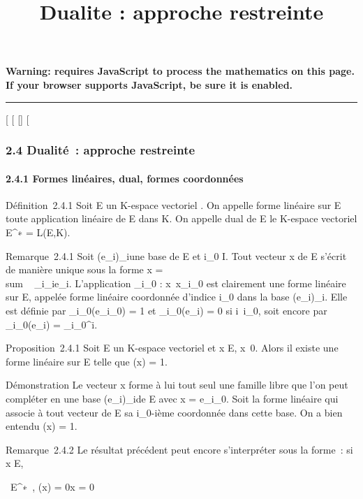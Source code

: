 \documentclass[]{article}
\title{Dualite : approche restreinte}
\author{}
\date{}
\begin{document}
\maketitle

\textbf{Warning: 
requires JavaScript to process the mathematics on this page.\\ If your
browser supports JavaScript, be sure it is enabled.}

\begin{center}\rule{3in}{0.4pt}\end{center}

{[}
{[}
{[}{]}
{[}

\subsubsection{2.4 Dualité~: approche restreinte}

\paragraph{2.4.1 Formes linéaires, dual, formes coordonnées}

Définition~2.4.1 Soit E un K-espace vectoriel . On appelle forme
linéaire sur E toute application linéaire de E dans K. On appelle dual
de E le K-espace vectoriel E^∗ = L(E,K).

Remarque~2.4.1 Soit (e\_i)\_i\inI une base de E et
i\_0 \in I. Tout vecteur x de E s'écrit de manière unique sous la
forme x = \\sum ~
\_i\inIx\_ie\_i. L'application
\phi\_i\_0 :
x\mapsto~x\_i\_0 est clairement une
forme linéaire sur E, appelée forme linéaire coordonnée d'indice
i\_0 dans la base (e\_i)\_i\inI. Elle est définie
par \phi\_i\_0(e\_i\_0) = 1 et
\phi\_i\_0(e\_i) = 0 si
i\neq~i\_0, soit encore par
\phi\_i\_0(e\_i) =
\delta\_i\_0^i.

Proposition~2.4.1 Soit E un K-espace vectoriel et x \in E,
x\neq~0. Alors il existe une forme linéaire \phi sur
E telle que \phi(x) = 1.

Démonstration Le vecteur x forme à lui tout seul une famille libre que
l'on peut compléter en une base (e\_i)\_i\inI de E avec x
= e\_i\_0. Soit \phi la forme linéaire qui associe à tout
vecteur de E sa i\_0-ième coordonnée dans cette base. On a bien
entendu \phi(x) = 1.

Remarque~2.4.2 Le résultat précédent peut encore s'interpréter sous la
forme~: si x \in E,

\forall~\phi \in E^∗~, \phi(x) =
0\quad \Leftrightarrow x = 0
\end{document}
